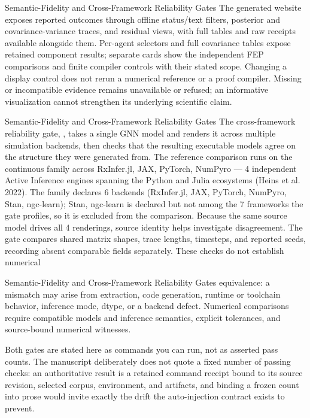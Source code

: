 \documentclass[
  ignorenonframetext,
]{beamer}
\begin{document}
\begin{frame}{Semantic-Fidelity and
Cross-Framework Reliability Gates}
The generated website exposes reported outcomes through offline
status/text filters, posterior and covariance-variance traces, and
residual views, with full tables and raw receipts available alongside
them. Per-agent selectors and full covariance tables expose retained
component results; separate cards show the independent FEP comparisons
and finite compiler controls with their stated scope. Changing a display
control does not rerun a numerical reference or a proof compiler.
Missing or incompatible evidence remains unavailable or refused; an
informative visualization cannot strengthen its underlying scientific
claim.

\end{frame}

\begin{frame}{Semantic-Fidelity and
Cross-Framework Reliability Gates}
The cross-framework reliability gate,
, takes a single
GNN model and renders it across multiple simulation backends, then
checks that the resulting executable models agree on the structure they
were generated from. The reference comparison runs on the continuous
family across RxInfer.jl, JAX, PyTorch, NumPyro --- 4 independent Active
Inference engines spanning the Python and Julia ecosystems (Heins et al.
2022). The family declares 6 backends (RxInfer.jl, JAX, PyTorch,
NumPyro, Stan, ngc-learn); Stan, ngc-learn is declared but not among the
7 frameworks the gate profiles, so it is excluded from the comparison.
Because the same source model drives all 4 renderings, source identity
helps investigate disagreement. The gate compares shared matrix shapes,
trace lengths, timesteps, and reported seeds, recording absent
comparable fields separately. These checks do not establish numerical
\end{frame}

\begin{frame}{Semantic-Fidelity and
Cross-Framework Reliability Gates}
equivalence: a mismatch may arise from extraction, code generation,
runtime or toolchain behavior, inference mode, dtype, or a backend
defect. Numerical comparisons require compatible models and inference
semantics, explicit tolerances, and source-bound numerical witnesses.

Both gates are stated here as commands you can run, not as asserted pass
counts. The manuscript deliberately does not quote a fixed number of
passing checks: an authoritative result is a retained command receipt
bound to its source revision, selected corpus, environment, and
artifacts, and binding a frozen count into prose would invite exactly
the drift the auto-injection contract exists to prevent.

\end{frame}
\end{document}
